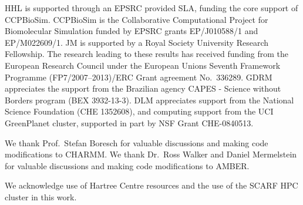 \documentclass[journal=jctcce,manuscript=article]{achemso}
\begin{document}
\begin{acknowledgement}
  HHL is supported through an EPSRC provided SLA, funding the core
  support of CCPBioSim.  CCPBioSim is the Collaborative Computational
  Project for Biomolecular Simulation funded by EPSRC grants
  EP/J010588/1 and EP/M022609/1.  JM is supported by a Royal Society
  University Research Fellowship.  The research leading to these
  results has received funding from the European Research Council
  under the European Unions Seventh Framework Programme
  (FP7/2007--2013)/ERC Grant agreement No.\ 336289.  GDRM appreciates
  the support from the Brazilian agency CAPES - Science without
  Borders program (BEX 3932-13-3).  DLM appreciates support from the
  National Science Foundation (CHE 1352608), and computing support
  from the UCI GreenPlanet cluster, supported in part by NSF Grant
  CHE-0840513.

  We thank Prof.\ Stefan Boresch for valuable discussions and making
  code modifications to CHARMM.  We thank Dr.\ Ross Walker and Daniel
  Mermelstein for valuable discussions and making code modifications
  to AMBER.

  We acknowledge use of Hartree Centre resources and the use of the
  SCARF HPC cluster in this work.
\end{acknowledgement}



\end{document}
